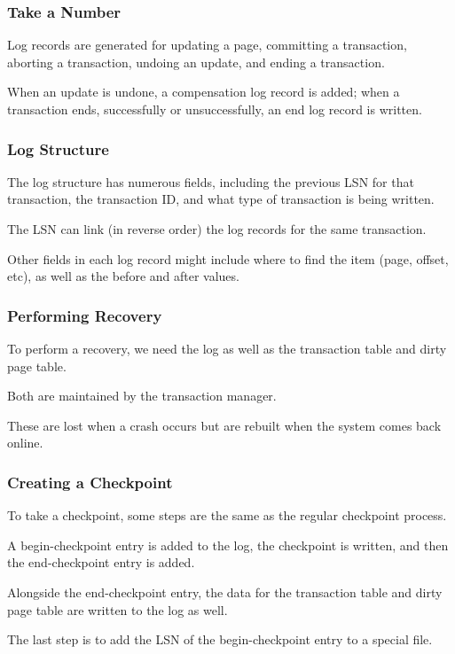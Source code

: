 \begin{frame}
\frametitle{Take a Number}

Log records are generated for updating a page, committing a transaction, aborting a transaction, undoing an update, and ending a transaction. 

When an update is undone, a compensation log record is added; when a transaction ends, successfully or unsuccessfully, an end log record is written.
\end{frame}



\begin{frame}
\frametitle{Log Structure}

The log structure has numerous fields, including the previous LSN for that transaction, the transaction ID, and what type of transaction is being written. 

The LSN can link (in reverse order) the log records for the same transaction. 

Other fields in each log record might include where to find the item (page, offset, etc), as well as the before and after values.


\end{frame}


\begin{frame}
\frametitle{Performing Recovery}

To perform a recovery, we need the log as well as the \alert{transaction table} and \alert{dirty page table}.

Both are maintained by the transaction manager.

These are lost when a crash occurs but are rebuilt when the system comes back online.

\end{frame}

\begin{frame}
\frametitle{Creating a Checkpoint}

To take a checkpoint, some steps are the same as the regular checkpoint process. 

A begin-checkpoint entry is added to the log, the checkpoint is written, and then the end-checkpoint entry is added. 

Alongside the end-checkpoint entry, the data for the transaction table and dirty page table are written to the log as well.

The last step is to add the LSN of the begin-checkpoint entry to a special file.

\end{frame}


